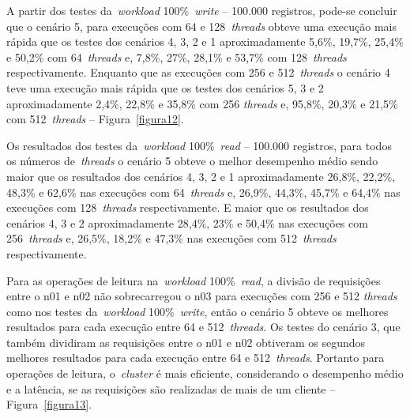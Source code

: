 \documentclass[12pt]{article}
\begin{document}
A partir dos testes da~\emph{workload} 100\%~\emph{write} -- 100.000 registros, pode-se concluir que o cenário 5, para execuções com 64 e 128~\emph{threads} obteve uma execução mais rápida que os testes dos cenários 4, 3, 2 e 1 aproximadamente 5,6\%, 19,7\%, 25,4\% e 50,2\% com 64~\emph{threads} e, 7,8\%, 27\%, 28,1\% e 53,7\% com 128~\emph{threads} respectivamente. Enquanto que as execuções com 256 e 512~\emph{threads} o cenário 4 teve uma execução mais rápida que os testes dos cenários 5, 3 e 2 aproximadamente 2,4\%, 22,8\% e 35,8\% com 256 \emph{threads} e, 95,8\%, 20,3\% e 21,5\% com 512~\emph{threads} -- Figura~\ref{figura12}.

Os resultados dos testes da~\emph{workload} 100\%~\emph{read} -- 100.000 registros, para todos os números de~\emph{threads} o cenário 5 obteve o melhor desempenho médio sendo maior que os resultados dos cenários 4, 3, 2 e 1 aproximadamente 26,8\%, 22,2\%, 48,3\% e 62,6\% nas execuções com 64~\emph{threads} e, 26,9\%, 44,3\%, 45,7\% e 64,4\% nas execuções com 128~\emph{threads} respectivamente. E maior que os resultados dos cenários 4, 3 e 2 aproximadamente 28,4\%, 23\% e 50,4\% nas execuções com 256~\emph{threads} e, 26,5\%, 18,2\% e 47,3\% nas execuções com 512~\emph{threads} respectivamente.

Para as operações de leitura na~\emph{workload} 100\%~\emph{read}, a divisão de requisições entre o n01 e n02 não sobrecarregou o n03 para execuções com 256 e 512 \emph{threads} como nos testes da~\emph{workload} 100\%~\emph{write}, então o cenário 5 obteve os melhores resultados para cada execução entre 64 e 512~\emph{threads}. Os testes do cenário 3, que também dividiram as requisições entre o n01 e n02 obtiveram os segundos melhores resultados para cada execução entre 64 e 512~\emph{threads}. Portanto para operações de leitura, o~\emph{cluster} é mais eficiente, considerando o desempenho médio e a latência, se as requisições são realizadas de mais de um cliente -- Figura~\ref{figura13}.
\end{document}
